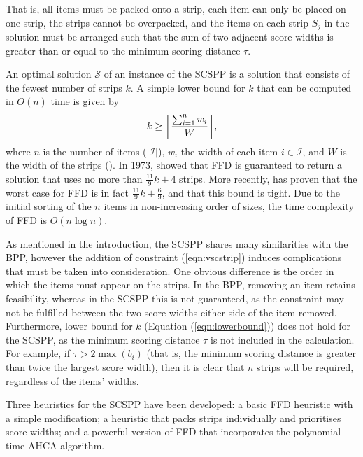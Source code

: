 \documentclass[oribibl]{llncs}
\begin{document}
That is, all items must be packed onto a strip, each item can only be placed on one strip, the strips cannot be overpacked, and the items on each strip $S_j$ in the solution must be arranged such that the sum of two adjacent score widths is greater than or equal to the minimum scoring distance $\tau$.

An optimal solution $\mathcal{S}$ of an instance of the SCSPP is a solution that consists of the fewest number of strips $k$. A simple lower bound for $k$ that can be computed in $O(n)$ time is given by 
\begin{equation}
\label{eqn:lowerbound}
k \geq \ceil*{\frac{\sum_{i=1}^{n}w_i}{W}},
\end{equation}
where $n$ is the number of items ($|\mathcal{I}|$), $w_i$ the width of each item $i \in \mathcal{I}$, and $W$ is the width of the strips (\citealp{martello1990b}). In 1973, \citeauthor{johnson1973} showed that FFD is guaranteed to return a solution that uses no more than $\frac{11}{9}k + 4$ strips. More recently, \cite{dosa2007} has proven that the worst case for FFD is in fact $\frac{11}{9}k + \frac{6}{9}$, and that this bound is tight. Due to the initial sorting of the $n$ items in non-increasing order of sizes, the time complexity of FFD is $O(n\log n)$.

As mentioned in the introduction, the SCSPP shares many similarities with the BPP, however the addition of constraint (\ref{eqn:vscstrip}) induces complications that must be taken into consideration. One obvious difference is the order in which the items must appear on the strips. In the BPP, removing an item retains feasibility, whereas in the SCSPP this is not guaranteed, as the constraint may not be fulfilled between the two score widths either side of the item removed. Furthermore, lower bound for $k$ (Equation (\ref{eqn:lowerbound})) does not hold for the SCSPP, as the minimum scoring distance $\tau$ is not included in the calculation. For example, if $\tau > 2 \max(b_i)$ (that is, the minimum scoring distance is greater than twice the largest score width), then it is clear that $n$ strips will be required, regardless of the items' widths.

Three heuristics for the SCSPP have been developed: a basic FFD heuristic with a simple modification; a heuristic that packs strips individually and prioritises score widths; and a powerful version of FFD that incorporates the polynomial-time AHCA algorithm.
\end{document}
